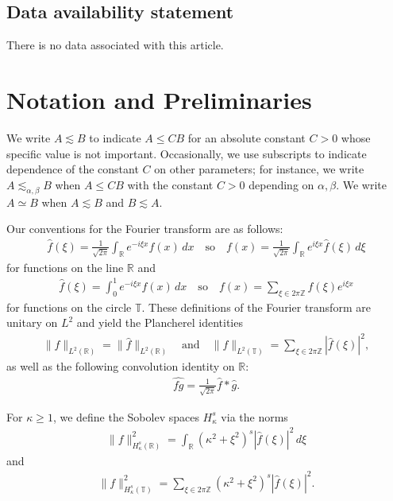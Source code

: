 \documentclass{amsart}
\newcommand{\R}{{\mathbb{R}}}
\newcommand{\T}{{\mathbb{T}}}
\newcommand{\Z}{{\mathbb{Z}}}
\newcommand{\qtq}[1]{\quad\text{#1}\quad}
\theoremstyle{definition}
\theoremstyle{remark}
\begin{document}
\subsection*{Data availability statement} There is no data associated with this article.

\section{Notation and Preliminaries}\label{S:2}

We write $A\lesssim B$ to indicate $A\leq CB$ for an absolute constant $C>0$ whose specific value is not important.  Occasionally, we use subscripts to indicate dependence of the constant $C$ on other parameters; for instance, we write $A \lesssim_{\alpha, \beta} B$ when $A \leq CB$ with the constant $C>0$ depending on $\alpha, \beta$.  We write $A\simeq B$ when $A\lesssim B$ and $B\lesssim A$.

Our conventions for the Fourier transform are as follows:
\begin{align*}
\widehat f(\xi) = \tfrac{1}{\sqrt{2\pi}} \int_\R e^{-i\xi x} f(x)\,dx  \qtq{so} f(x) = \tfrac{1}{\sqrt{2\pi}} \int_\R e^{i\xi x} \widehat f(\xi)\,d\xi
\end{align*}
for functions on the line \(\R\) and
\begin{align*}
\widehat f(\xi) = \int_0^1 e^{- i\xi x} f(x)\,dx \qtq{so} f(x) = \sum_{\xi\in 2\pi\Z} \widehat f(\xi) e^{i\xi x}
\end{align*}
for functions on the circle $\T$.  These definitions of the Fourier transform are unitary on $L^2$ and yield the Plancherel identities
\begin{align*}
    \|f\|_{L^2(\mathbb R)}=\|\widehat f\|_{L^2(\mathbb R)} \qtq{and}   \|f\|_{L^2(\mathbb T)}=\sum_{\xi\in 2\pi \mathbb Z}|\widehat f(\xi)|^2,
\end{align*}
as well as the following convolution identity on $\R$:
\begin{align*}
    \widehat {fg}= \tfrac{1}{\sqrt{2\pi}} \widehat f \ast \widehat g.
\end{align*}

For $\kappa\geq 1$, we define the Sobolev spaces $H^s_\kappa$ via the norms
\begin{align*}
\| f\|_{H^{s}_\kappa(\R)}^2 = \int_\R (\kappa^2+\xi^2)^s |\widehat f(\xi)|^2  \,d\xi
\end{align*}
and
\begin{align*}
\| f\|_{H^{s}_\kappa(\T)}^2 = \sum_{\xi\in 2\pi\Z} (\kappa^2+\xi^2)^s |\widehat f(\xi)|^2.
\end{align*}
\end{document}

